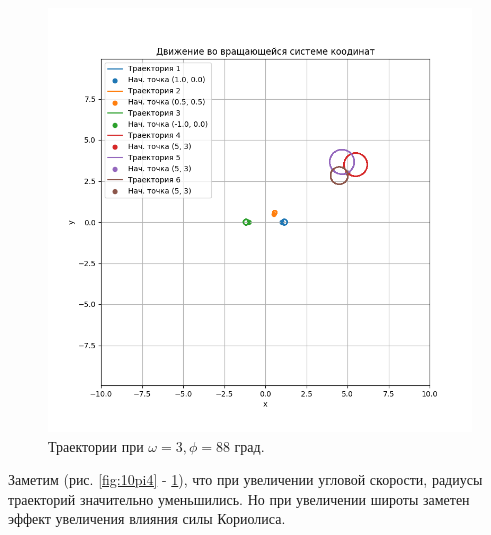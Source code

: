 \begin{figure}[h]  %
	\centering
	\includegraphics[height=0.7\textwidth]{imgs/3_88.png}  %
	\caption{Траектории при \(\omega = 3, \phi = 88\) град.}  %
	\label{fig:10pi2.5}  %
\end{figure}
\newpage

Заметим (рис. \ref{fig:10pi4} - \ref{fig:10pi2.5}), что при увеличении угловой скорости, радиусы траекторий значительно уменьшились. Но при увеличении широты заметен эффект увеличения влияния силы Кориолиса.



